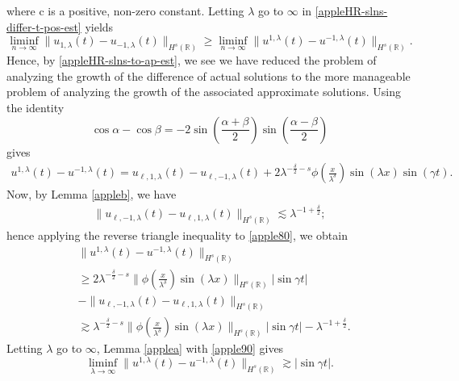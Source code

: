 \documentclass[12pt,reqno]{amsart}
\newcommand{\rr}{\mathbb{R}}
\theoremstyle{plain}  %
\theoremstyle{definition}
\begin{document}
where c is a positive, non-zero constant. Letting $\lambda$ go to $\infty$ in
\eqref{appleHR-slns-differ-t-pos-est}
yields
%
\begin{equation} 
	\label{appleHR-slns-to-ap-est}
	\liminf_{n\to\infty}
	\|
	u_{1,\lambda}(t)
	-
	u_{- 1,\lambda}(t)
	\|_{H^s(\rr)}
	\ge
	\liminf_{n\to\infty}
	\|
	u^{1,\lambda}(t)
	-
	u^{- 1,\lambda}(t)
	\|_{H^s(\rr)}.
\end{equation}
%
%
Hence, by \eqref{appleHR-slns-to-ap-est}, we see we have reduced the problem of
analyzing the growth of the difference of actual solutions to the more
manageable problem of analyzing the growth of the associated approximate
solutions. Using the identity 
$$
\cos \alpha -\cos \beta
=
-2
\sin(\frac{\alpha + \beta}{2})
\sin(\frac{\alpha - \beta}{2})
$$
gives
\begin{equation}
	\label{apple80}
	\begin{split}
u^{1,\lambda}(t)
-
u^{- 1,\lambda}(t)
=
u_{\ell,1,\lambda}(t) - u_{\ell,-1,\lambda}(t) + 2\lambda^{-\frac{\delta}{2}-s}
\phi\left( \frac{x}{\lambda^\delta} \right)\sin(\lambda x) \sin(\gamma t).
\end{split}
\end{equation}
Now, by Lemma \ref{appleb}, we have
\begin{equation*}
	\begin{split}
	\|u_{\ell,-1,\lambda}(t) - u_{\ell,1,\lambda}(t)\|_{H^s(\rr)} \lesssim
	\lambda^{-1 + \frac{\delta}{2}};
	\end{split}
\end{equation*}
hence applying the reverse triangle inequality to \eqref{apple80}, we obtain
\begin{equation} 
	\label{apple90}
	\begin{split}
	& \|
	u^{1,\lambda}(t)
	-
	u^{- 1,\lambda}(t)
	\|_{H^s(\rr)}
	\\
	& \ge 2 \lambda^{-\frac{\delta}{2}-s} \|\phi\left(
	\frac{x}{\lambda^\delta} \right) \sin(\lambda x) \|_{H^s(\rr)} |\sin \gamma t|
	\\
	& - \|u_{\ell,-1,\lambda}(t) - u_{\ell,1,\lambda}(t)\|_{H^s(\rr)} 
	\\
	& \gtrsim \lambda^{-\frac{\delta}{2}-s} \|\phi\left(
	\frac{x}{\lambda^\delta} \right ) \sin(\lambda x) \|_{H^s(\rr)} |\sin \gamma t| -
	\lambda^{-1 + \frac{\delta}{2}}.
\end{split}
\end{equation}
%
%
Letting $\lambda$ go to $\infty$, Lemma \ref{applea}
with \eqref{apple90}  gives
%
%
\begin{equation} 
	\label{apple91}
	\liminf_{\lambda \to\infty}
	\|
	u^{1,\lambda}(t)
	-
	u^{- 1,\lambda}(t)
	\|_{H^s(\rr)}
	\gtrsim
	|\sin \gamma t|.
\end{equation}
\end{document}
